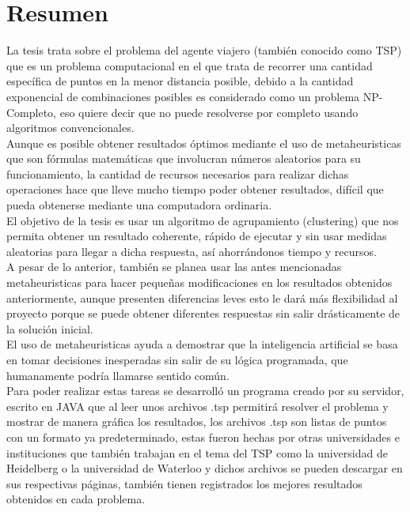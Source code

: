 \section*{Resumen}
La tesis trata sobre el problema del agente viajero (también conocido como TSP) que es un problema computacional en el que trata de recorrer una cantidad específica de puntos en la menor distancia posible, debido a la cantidad exponencial de combinaciones posibles es considerado como un problema NP-Completo, eso quiere decir que no puede resolverse por completo usando algoritmos convencionales.\\
\hspace*{1cm} Aunque es posible obtener resultados óptimos mediante el uso de metaheuristicas que son fórmulas matemáticas que involucran números aleatorios para su funcionamiento, la cantidad de recursos necesarios para realizar dichas operaciones hace que lleve mucho tiempo poder obtener resultados, difícil que pueda obtenerse mediante una computadora ordinaria.\\
\hspace*{1cm} El objetivo de la tesis es usar un algoritmo de agrupamiento (clustering) que nos permita obtener un resultado coherente, rápido de ejecutar y sin usar medidas aleatorias para llegar a dicha respuesta, así ahorrándonos tiempo y recursos.\\
\hspace*{1cm} A pesar de lo anterior, también se planea usar las antes mencionadas metaheuristicas para hacer pequeñas modificaciones en los resultados obtenidos anteriormente, aunque presenten diferencias leves esto le dará más flexibilidad al proyecto porque se puede obtener diferentes respuestas sin salir drásticamente de la solución inicial.\\
\hspace*{1cm}El uso de metaheuristicas ayuda a demostrar que la inteligencia artificial se basa en tomar decisiones inesperadas sin salir de su lógica programada, que humanamente podría llamarse sentido común.\\
\hspace*{1cm} Para poder realizar estas tareas se desarrolló un programa creado por su servidor, escrito en JAVA que al leer unos archivos .tsp permitirá resolver el problema y mostrar de manera gráfica los resultados, los archivos .tsp son listas de puntos con un formato ya predeterminado, estas fueron hechas por otras universidades e instituciones que también trabajan en el tema del TSP como la universidad de Heidelberg o la universidad de Waterloo y dichos archivos se pueden descargar en sus respectivas páginas, también tienen registrados los mejores resultados obtenidos en cada problema.\\
